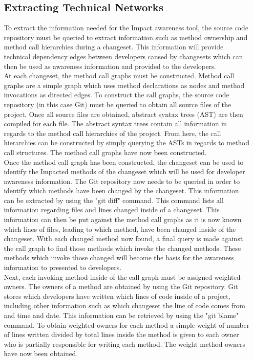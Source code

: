 \documentclass[conference]{IEEEtran}
\begin{document}
\subsection{Extracting Technical Networks}
To extract the information needed for the Impact awareness tool, the source code repository must be queried to
extract information such as method ownership and method call hierarchies during a changeset. This information
will provide technical dependency edges between developers caused by changesets which can then be used as
awareness information and provided to the developers. \\

At each changeset, the method call graphs must be constructed. Method call graphs are a simple graph which uses
method declarations as nodes and method invocations as directed edges. To construct the call graphs, the source 
code repository (in this case Git) must be queried to obtain all source files of the project. Once all source files are
obtained, abstract syntax trees (AST) are then compiled for each file. The abstract syntax trees contain all information
in regards to the method call hierarchies of the project. From here, the call hierarchies can be constructed by simply
querying the ASTs in regards to method call structures. The method call graphs have now been constructed.\\

Once the method call graph has been constructed, the changeset can be used to identify the Impacted methods
of the changeset which will be used for developer awareness information. The Git repository now needs to be
queried in order to identify which methods have been changed by the changeset. This information can be 
extracted by using the "git diff" command. This command lists all information regarding files and lines
changed inside of a changeset. This information can then be put against the method call graphs as it is now 
known which lines of files, leading to which method, have been changed inside of the changeset. With each
changed method now found, a final query is made against the call graph to find those methods which invoke
the changed methods. These methods which invoke those changed will become the basis for the awareness
information to presented to developers. \\

Next, each invoking method inside of the call graph must be assigned weighted owners. The owners of a method are obtained
by using the Git repository. Git stores which developers have written which lines of code inside of a project, including
other information such as which changeset the line of code comes from and time and date. This information can be
retrieved by using the "git blame" command. To obtain weighted owners for each method a simple weight of number 
of lines written divided by total lines inside the method is given to each owner who is partially responsible for writing
each method. The weight method owners have now been obtained. \\
\end{document}
